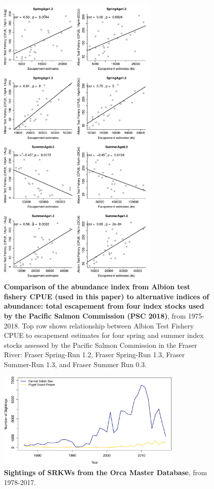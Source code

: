\documentclass{article}
\begin{document}
\begin{figure}[!hp]
\includegraphics[width=0.7\textwidth]{../analyses/orcaphen/figures/ctcalbion.pdf}
\caption{\textbf{Comparison of the abundance index from Albion test fishery CPUE (used in this paper) to alternative indices of abundance: total escapement from four index stocks used by the Pacific Salmon Commission (PSC 2018)}, from 1975-2018. Top row shows relationship between Albion Test Fishery CPUE to escapement estimates for four spring and summer index stocks assessed by the Pacific Salmon Commission in the Fraser River: Fraser Spring-Run 1.2, Fraser Spring-Run 1.3, Fraser Summer-Run 1.3, and Fraser Summer Run 0.3.}
\label{fig:ctcalb}
\end{figure}


\vspace*{\floatsep}

\begin{figure}[!hp]
\includegraphics[width=0.8\textwidth]{../analyses/figures/OrcaPhenPlots/numsights_1976_2regs.png} 
\caption{\textbf{Sightings of SRKWs from the Orca Master Database}, from 1978-2017. }
\label{fig:sights}
\end{figure}
\end{document}

